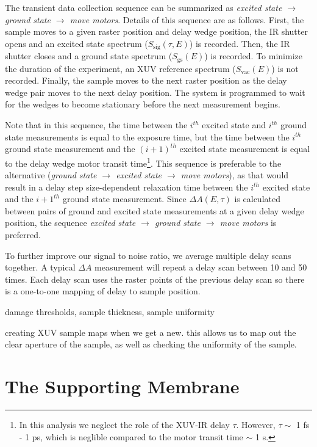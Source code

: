 The transient data collection sequence can be summarized as \textit{excited state $\rightarrow$ ground state $\rightarrow$ move motors}. Details of this sequence are as follows. First, the sample moves to a given raster position and delay wedge position, the IR shutter opens and an excited state spectrum ($S_{\text{sig}}(\tau,E)$) is recorded. Then, the IR shutter closes and a ground state spectrum ($S_{\text{gs}}(E)$) is recorded. To minimize the duration of the experiment, an XUV reference spectrum ($S_{\text{vac}}(E)$) is not recorded. Finally, the sample moves to the next raster position as the delay wedge pair moves to the next delay position. The system is programmed to wait for the wedges to become stationary before the next measurement begins.

Note that in this sequence, the time between the $i^{th}$ excited state and $i^{th}$ ground state measurements is equal to the exposure time, but the time between the $i^{th}$ ground state measurement and the $(i+1)^{th}$ excited state measurement is equal to the delay wedge motor transit time\footnote{In this analysis we neglect the role of the XUV-IR delay $\tau$. However, $\tau \sim$ 1 fs - 1 ps, which is neglible compared to the motor transit time $\sim$ 1 s.}. This sequence is preferable to the alternative (\textit{ground state $\rightarrow$ excited state $\rightarrow$ move motors}), as that would result in a delay step size-dependent relaxation time between the $i^{th}$ excited state and the $i+1^{th}$ ground state measurement. Since $\Delta A(E,\tau)$ is calculated between pairs of ground and excited state measurements at a given delay wedge position, the sequence \textit{excited state $\rightarrow$ ground state $\rightarrow$ move motors} is preferred.



To further improve our signal to noise ratio, we average multiple delay scans together. A typical $\Delta A$ measurement will repeat a delay scan between 10 and 50 times. Each delay scan uses the raster points of the previous delay scan so there is a one-to-one mapping of delay to sample position.



damage thresholds, sample thickness, sample uniformity

creating XUV sample maps when we get a new. this allows us to map out the clear aperture of the sample, as well as checking the uniformity of the sample.

\section{The Supporting Membrane}

